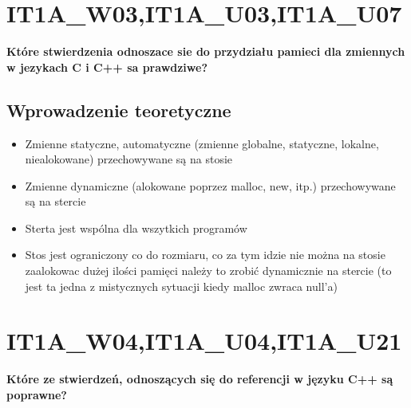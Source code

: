 \section{IT1A\_W03,IT1A\_U03,IT1A\_U07} 
\textbf{Które stwierdzenia odnoszace sie do przydziału pamieci dla zmiennych w jezykach C i C++ sa prawdziwe?}

\subsection{Wprowadzenie teoretyczne}

\begin{itemize}
\item Zmienne statyczne, automatyczne (zmienne globalne, statyczne, lokalne, niealokowane) przechowywane są na stosie
\item Zmienne dynamiczne (alokowane poprzez malloc, new, itp.) przechowywane są na stercie
\item Sterta jest wspólna dla wszytkich programów
\item Stos jest ograniczony co do rozmiaru, co za tym idzie nie można na stosie zaalokowac dużej ilości pamięci należy to zrobić dynamicznie na stercie (to jest ta jedna z mistycznych sytuacji kiedy malloc zwraca null'a)
\end{itemize}


\section{IT1A\_W04,IT1A\_U04,IT1A\_U21} 
\textbf{Które ze stwierdzeń, odnoszących się do referencji w języku C++ są poprawne?}


